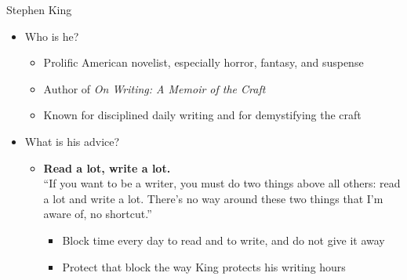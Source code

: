 \documentclass[aspectratio=169]{beamer}
\begin{document}
\begin{frame}{Stephen King}
  \begin{itemize}
  \item Who is he?
  \begin{itemize}
    \item Prolific American novelist, especially horror, fantasy, and suspense
    \item Author of \emph{On Writing: A Memoir of the Craft} \citep{king:onwriting}
    \item Known for disciplined daily writing and for demystifying the craft
  \end{itemize}
\item What is his advice?
  \begin{itemize}
    \item \textbf{Read a lot, write a lot.}\\
      ``If you want to be a writer, you must do two things above all others: read a lot and write a lot.  There's no way around these two things that I'm aware of, no shortcut.'' \citep[p~145]{king:onwriting}
      \begin{itemize}
        \item Block time every day to read and to write, and do not give it away
        \item Protect that block the way King protects his writing hours
      \end{itemize}
    \end{itemize}
  \end{itemize}
\end{frame}


\end{document}
